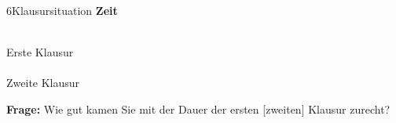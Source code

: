 \documentclass[xcolor=table,9pt,aspectratio=169]{beamer}
\begin{document}
\begin{frame}{\vspace*{10mm}6\hspace*{1em}Klausursituation}
\textbf{Zeit}\\
\begin{multicols}{2}
   \begin{center}
      \\Erste Klausur\\
      \\Zweite Klausur\\
   \end{center}
\end{multicols}
\textbf{Frage:} Wie gut kamen Sie mit der Dauer der ersten [zweiten] Klausur zurecht?
\end{frame}
\end{document}
